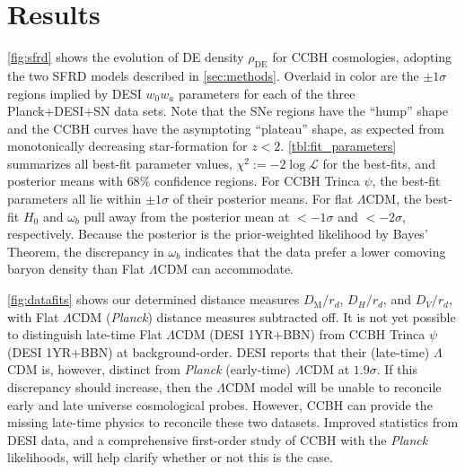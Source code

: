\documentclass[a4paper,11pt]{article}
\begin{document}
\section{Results}
\label{sec:results}
\cref{fig:sfrd} shows the evolution of DE density $\rho_\mathrm{DE}$ for CCBH cosmologies, adopting the two SFRD models described in \cref{sec:methods}.
Overlaid in color are the $\pm 1\sigma$ regions implied by DESI $w_0w_a$ parameters for each of the three Planck+DESI+SN data sets.
Note that the SNe regions have the ``hump'' shape and the CCBH curves have the asymptoting ``plateau'' shape, as expected from monotonically decreasing star-formation for $z < 2$.
\cref{tbl:fit_parameters} summarizes all best-fit parameter values, $\chi^2 := -2 \log \mathcal{L}$ for the best-fits, and posterior means with $68\%$ confidence regions.
For CCBH Trinca $\psi$, the best-fit parameters all lie within $\pm 1\sigma$ of their posterior means.
For flat $\Lambda$CDM, the best-fit $H_0$ and $\omega_b$ pull away from the posterior mean at $<-1\sigma$ and $<-2\sigma$, respectively.
Because the posterior is the prior-weighted likelihood by Bayes' Theorem, the discrepancy in $\omega_b$ indicates that the data prefer a lower comoving baryon density than Flat $\Lambda$CDM can accommodate.

\cref{fig:datafits} shows our determined distance measures $D_\mathrm{M}/r_d$, $D_H/r_d$, and $D_V/r_d$, with Flat $\Lambda$CDM (\emph{Planck}) distance measures subtracted off.
It is not yet possible to distinguish late-time Flat $\Lambda$CDM (DESI 1YR+BBN) from CCBH Trinca $\psi$ (DESI 1YR+BBN) at background-order.
DESI reports that their (late-time) $\Lambda$CDM is, however, distinct from \emph{Planck} (early-time) $\Lambda$CDM at $1.9\sigma$.
If this discrepancy should increase, then the $\Lambda$CDM model will be unable to reconcile early and late universe cosmological probes.
However, CCBH can provide the missing late-time physics to reconcile these two datasets.
Improved statistics from DESI data, and a comprehensive first-order study of CCBH with the \emph{Planck} likelihoods, will help clarify whether or not this is the case.
\end{document}
